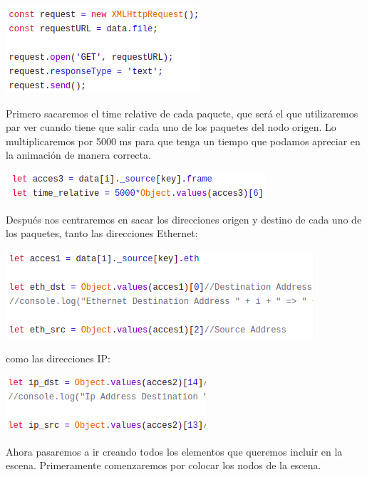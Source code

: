 \documentclass[a4paper, 12pt]{book}
\begin{document}
\begin{center}
    \includegraphics[scale=0.7]{img/get_comp_netsim.png}
\end{center}

Primero sacaremos el time relative de cada paquete, que será el que utilizaremos par ver cuando tiene que salir cada uno de los paquetes del nodo origen.
Lo multiplicaremos por 5000 ms para que tenga un tiempo que podamos apreciar en la animación de manera correcta.

\begin{center}
    \includegraphics[scale=0.7]{img/timerelat_comp_netsim.png}
\end{center}
\newpage
Después nos centraremos en sacar los direcciones origen y destino de cada uno de los paquetes, tanto las direcciones Ethernet:

\begin{center}
    \includegraphics[scale=0.7]{img/eth_comp_netsim.png}
\end{center}

como las direcciones IP:

\begin{center}
    \includegraphics[scale=0.7]{img/ip_comp_netsim.png}
\end{center}

Ahora pasaremos a ir creando todos los elementos que queremos incluir en la escena. Primeramente comenzaremos por colocar los nodos de la escena.
\end{document}
